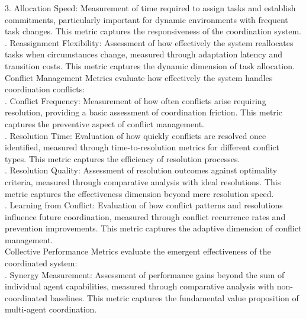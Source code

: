 3. Allocation Speed: Measurement of time required to assign tasks and establish commitments, particularly important for dynamic environments with frequent task changes. This metric captures the responsiveness of the coordination system.\\ . Reassignment Flexibility: Assessment of how effectively the system reallocates tasks when circumstances change, measured through adaptation latency and transition costs. This metric captures the dynamic dimension of task allocation.\\ \newline
Conflict Management Metrics evaluate how effectively the system handles coordination conflicts:\\ . Conflict Frequency: Measurement of how often conflicts arise requiring resolution, providing a basic assessment of coordination friction. This metric captures the preventive aspect of conflict management.\\ . Resolution Time: Evaluation of how quickly conflicts are resolved once identified, measured through time-to-resolution metrics for different conflict types. This metric captures the efficiency of resolution processes.\\ . Resolution Quality: Assessment of resolution outcomes against optimality criteria, measured through comparative analysis with ideal resolutions. This metric captures the effectiveness dimension beyond mere resolution speed.\\ . Learning from Conflict: Evaluation of how conflict patterns and resolutions influence future coordination, measured through conflict recurrence rates and prevention improvements. This metric captures the adaptive dimension of conflict management.\\ \newline
Collective Performance Metrics evaluate the emergent effectiveness of the coordinated system:\\ . Synergy Measurement: Assessment of performance gains beyond the sum of individual agent capabilities, measured through comparative analysis with non-coordinated baselines. This metric captures the fundamental value proposition of multi-agent coordination.\\ \newline
